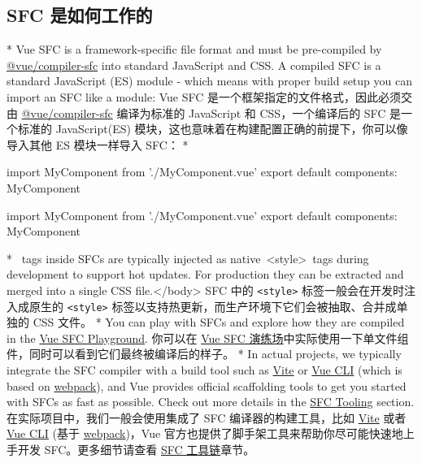 \begin{paracol}{2}
\subsection{SFC 是如何工作的}
\switchcolumn[0]*%
Vue SFC is a framework-specific file format and must be pre-compiled by
\href{https://github.com/vuejs/core/tree/main/packages/compiler-sfc}{@vue/compiler-sfc}
into standard JavaScript and CSS. A compiled SFC is a standard
JavaScript (ES) module - which means with proper build setup you can
import an SFC like a module:
\switchcolumn
Vue SFC 是一个框架指定的文件格式，因此必须交由
\href{https://github.com/vuejs/core/tree/main/packages/compiler-sfc}{@vue/compiler-sfc}
编译为标准的 JavaScript 和 CSS，一个编译后的 SFC 是一个标准的
JavaScript(ES) 模块，这也意味着在构建配置正确的前提下，你可以像导入其他
ES 模块一样导入 SFC：
\switchcolumn[0]*%
\begin{codeJs}
import MyComponent from './MyComponent.vue'
export default {
  components: {
    MyComponent
  }
}
\end{codeJs}
\switchcolumn
\begin{codeJs}
import MyComponent from './MyComponent.vue'
export default {
  components: {
    MyComponent
  }
}
\end{codeJs}
\switchcolumn[0]*%
~tags inside SFCs are typically injected as native~\textless style\textgreater~tags during development to support hot updates. For production they can be extracted and merged into a single CSS file.\textless/body\textgreater{}
\switchcolumn
SFC 中的 \texttt{\textless{}style\textgreater{}}
标签一般会在开发时注入成原生的 \texttt{\textless{}style\textgreater{}}
标签以支持热更新，而生产环境下它们会被抽取、合并成单独的 CSS 文件。
\switchcolumn[0]*%
You can play with SFCs and explore how they are compiled in the
\href{https://play.vuejs.org/}{Vue SFC Playground}.
\switchcolumn
你可以在 \href{https://play.vuejs.org/}{Vue SFC
演练场}中实际使用一下单文件组件，同时可以看到它们最终被编译后的样子。
\switchcolumn[0]*%
In actual projects, we typically integrate the SFC compiler with a build
tool such as \href{https://vitejs.dev/}{Vite} or
\href{http://cli.vuejs.org/}{Vue CLI} (which is based on
\href{https://webpack.js.org/}{webpack}), and Vue provides official
scaffolding tools to get you started with SFCs as fast as possible.
Check out more details in the
\href{https://vuejs.org/guide/scaling-up/tooling.html}{SFC Tooling}
section.
\switchcolumn
在实际项目中，我们一般会使用集成了 SFC 编译器的构建工具，比如
\href{https://cn.vitejs.dev/}{Vite} 或者
\href{https://cli.vuejs.org/zh/}{Vue CLI} (基于
\href{https://webpack.js.org/}{webpack})，Vue
官方也提供了脚手架工具来帮助你尽可能快速地上手开发 SFC。更多细节请查看
\href{https://cn.vuejs.org/guide/scaling-up/tooling.html}{SFC
工具链}章节。
\end{paracol}

